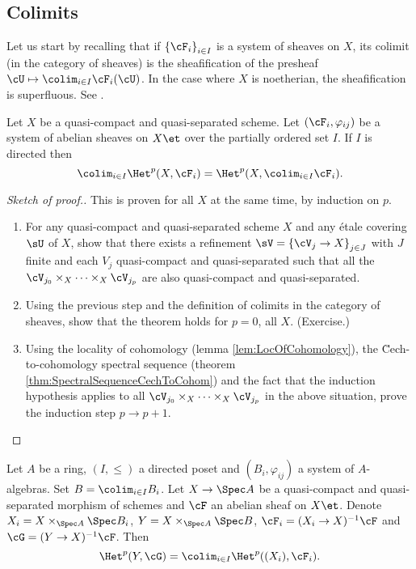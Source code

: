 \subsection{Colimits}

Let us start by recalling that if $\left\{\cF_i\right\}_{i\in I}$ is a system of sheaves on $X$, its colimit (in the category of sheaves) is the sheafification of the presheaf $\cU \mapsto \colim_{i\in I} \cF_i(\cU)$. In the case where $X$ is noetherian, the sheafification is superfluous. See \cite{Hartshorne}.  

\begin{thm}
Let $X$ be a quasi-compact and quasi-separated scheme. Let $\left(\cF_i, \varphi_{ij}\right)$ be a system of abelian sheaves on $X\et$ over the partially ordered set $I$. If $I$ is directed then
$$
\colim_{i\in I} \Het^p(X, \cF_i) = \Het^p(X, \colim_{i\in I} \cF_i).
$$
\end{thm}

\begin{proof}[Sketch of proof.] 
This is proven for all $X$ at the same time, by induction on $p$. 
\begin{enumerate}[\it Step 1.]
\item 
For any quasi-compact and quasi-separated scheme $X$ and any \'etale covering $\sU$ of $X$, show that there exists a refinement $\sV =\left\{\cV_j \to X\right\}_{j\in J}$ with $J$ finite and each $V_j$ quasi-compact and quasi-separated such that all the $\cV_{j_0} \times_X \cdots \times_X \cV_{j_p}$ are also quasi-compact and quasi-separated. 
\item 
Using the previous step and the definition of colimits in the category of sheaves, show that the theorem holds for $p=0$, all $X$. (Exercise.)
\item 
Using the locality of cohomology (lemma \ref{lem:LocOfCohomology}), the \u Cech-to-cohomology spectral sequence (theorem \ref{thm:SpectralSequenceCechToCohom}) and the fact that the induction hypothesis applies to all $\cV_{j_0}\times_X \cdots \times_X \cV_{j_p}$ in the above situation, prove the induction step $p\to p+1$. 
\end{enumerate}
\end{proof}

\begin{thm} \label{thm:directedColimitsAndCohomology}
Let $A$ be a ring, $(I, \leqslant)$ a directed poset and $(B_i, \varphi_{ij})$ a system of $A$-algebras. Set $B=\colim_{i\in I} B_i$. Let $X \to \Spec A$ be a quasi-compact and quasi-separated morphism of schemes and $\cF$ an abelian sheaf on $X\et$. Denote $X_i = X\times_{\Spec A} \Spec B_i$,  $Y= X \times_{\Spec A}\Spec B$, $\cF_i = (X_i\to X)^{-1}\cF$ and $\cG = (Y\to X)^{-1}\cF$. Then
$$
\Het^p(Y, \cG) = \colim_{i\in I} \Het^p ((X_i), \cF_i).
$$
\end{thm}

